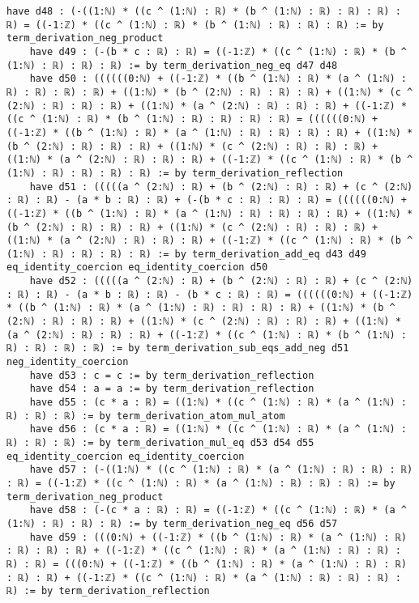 \documentclass{article}
\begin{document}
\begin{tcolorbox}[colback=white!10, width=\linewidth]
\begin{lstlisting}[language=Lean4]
    have d48 : (-((1:ℕ) * ((c ^ (1:ℕ) : ℝ) * (b ^ (1:ℕ) : ℝ) : ℝ) : ℝ) : ℝ) = ((-1:ℤ) * ((c ^ (1:ℕ) : ℝ) * (b ^ (1:ℕ) : ℝ) : ℝ) : ℝ) := by term_derivation_neg_product
    have d49 : (-(b * c : ℝ) : ℝ) = ((-1:ℤ) * ((c ^ (1:ℕ) : ℝ) * (b ^ (1:ℕ) : ℝ) : ℝ) : ℝ) := by term_derivation_neg_eq d47 d48
    have d50 : ((((((0:ℕ) + ((-1:ℤ) * ((b ^ (1:ℕ) : ℝ) * (a ^ (1:ℕ) : ℝ) : ℝ) : ℝ) : ℝ) + ((1:ℕ) * (b ^ (2:ℕ) : ℝ) : ℝ) : ℝ) + ((1:ℕ) * (c ^ (2:ℕ) : ℝ) : ℝ) : ℝ) + ((1:ℕ) * (a ^ (2:ℕ) : ℝ) : ℝ) : ℝ) + ((-1:ℤ) * ((c ^ (1:ℕ) : ℝ) * (b ^ (1:ℕ) : ℝ) : ℝ) : ℝ) : ℝ) = ((((((0:ℕ) + ((-1:ℤ) * ((b ^ (1:ℕ) : ℝ) * (a ^ (1:ℕ) : ℝ) : ℝ) : ℝ) : ℝ) + ((1:ℕ) * (b ^ (2:ℕ) : ℝ) : ℝ) : ℝ) + ((1:ℕ) * (c ^ (2:ℕ) : ℝ) : ℝ) : ℝ) + ((1:ℕ) * (a ^ (2:ℕ) : ℝ) : ℝ) : ℝ) + ((-1:ℤ) * ((c ^ (1:ℕ) : ℝ) * (b ^ (1:ℕ) : ℝ) : ℝ) : ℝ) : ℝ) := by term_derivation_reflection
    have d51 : (((((a ^ (2:ℕ) : ℝ) + (b ^ (2:ℕ) : ℝ) : ℝ) + (c ^ (2:ℕ) : ℝ) : ℝ) - (a * b : ℝ) : ℝ) + (-(b * c : ℝ) : ℝ) : ℝ) = ((((((0:ℕ) + ((-1:ℤ) * ((b ^ (1:ℕ) : ℝ) * (a ^ (1:ℕ) : ℝ) : ℝ) : ℝ) : ℝ) + ((1:ℕ) * (b ^ (2:ℕ) : ℝ) : ℝ) : ℝ) + ((1:ℕ) * (c ^ (2:ℕ) : ℝ) : ℝ) : ℝ) + ((1:ℕ) * (a ^ (2:ℕ) : ℝ) : ℝ) : ℝ) + ((-1:ℤ) * ((c ^ (1:ℕ) : ℝ) * (b ^ (1:ℕ) : ℝ) : ℝ) : ℝ) : ℝ) := by term_derivation_add_eq d43 d49 eq_identity_coercion eq_identity_coercion d50
    have d52 : (((((a ^ (2:ℕ) : ℝ) + (b ^ (2:ℕ) : ℝ) : ℝ) + (c ^ (2:ℕ) : ℝ) : ℝ) - (a * b : ℝ) : ℝ) - (b * c : ℝ) : ℝ) = ((((((0:ℕ) + ((-1:ℤ) * ((b ^ (1:ℕ) : ℝ) * (a ^ (1:ℕ) : ℝ) : ℝ) : ℝ) : ℝ) + ((1:ℕ) * (b ^ (2:ℕ) : ℝ) : ℝ) : ℝ) + ((1:ℕ) * (c ^ (2:ℕ) : ℝ) : ℝ) : ℝ) + ((1:ℕ) * (a ^ (2:ℕ) : ℝ) : ℝ) : ℝ) + ((-1:ℤ) * ((c ^ (1:ℕ) : ℝ) * (b ^ (1:ℕ) : ℝ) : ℝ) : ℝ) : ℝ) := by term_derivation_sub_eqs_add_neg d51 neg_identity_coercion
    have d53 : c = c := by term_derivation_reflection
    have d54 : a = a := by term_derivation_reflection
    have d55 : (c * a : ℝ) = ((1:ℕ) * ((c ^ (1:ℕ) : ℝ) * (a ^ (1:ℕ) : ℝ) : ℝ) : ℝ) := by term_derivation_atom_mul_atom
    have d56 : (c * a : ℝ) = ((1:ℕ) * ((c ^ (1:ℕ) : ℝ) * (a ^ (1:ℕ) : ℝ) : ℝ) : ℝ) := by term_derivation_mul_eq d53 d54 d55 eq_identity_coercion eq_identity_coercion
    have d57 : (-((1:ℕ) * ((c ^ (1:ℕ) : ℝ) * (a ^ (1:ℕ) : ℝ) : ℝ) : ℝ) : ℝ) = ((-1:ℤ) * ((c ^ (1:ℕ) : ℝ) * (a ^ (1:ℕ) : ℝ) : ℝ) : ℝ) := by term_derivation_neg_product
    have d58 : (-(c * a : ℝ) : ℝ) = ((-1:ℤ) * ((c ^ (1:ℕ) : ℝ) * (a ^ (1:ℕ) : ℝ) : ℝ) : ℝ) := by term_derivation_neg_eq d56 d57
    have d59 : (((0:ℕ) + ((-1:ℤ) * ((b ^ (1:ℕ) : ℝ) * (a ^ (1:ℕ) : ℝ) : ℝ) : ℝ) : ℝ) + ((-1:ℤ) * ((c ^ (1:ℕ) : ℝ) * (a ^ (1:ℕ) : ℝ) : ℝ) : ℝ) : ℝ) = (((0:ℕ) + ((-1:ℤ) * ((b ^ (1:ℕ) : ℝ) * (a ^ (1:ℕ) : ℝ) : ℝ) : ℝ) : ℝ) + ((-1:ℤ) * ((c ^ (1:ℕ) : ℝ) * (a ^ (1:ℕ) : ℝ) : ℝ) : ℝ) : ℝ) := by term_derivation_reflection

\end{lstlisting}
\end{tcolorbox}
\end{document}
